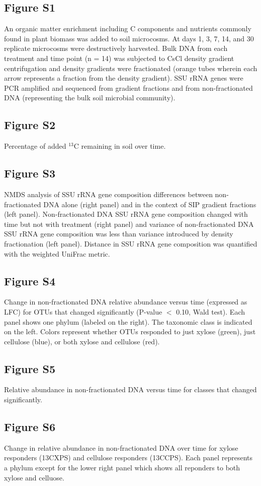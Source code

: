 \subsection{Figure S1}
An organic matter enrichment including C components and nutrients commonly found in plant biomass was added to soil microcosms. At days 1, 3, 7, 14, and 30 replicate microcosms were destructively harvested.  Bulk DNA from each treatment and time point (n = 14) was subjected to CsCl density gradient centrifugation and density gradients were fractionated (orange tubes wherein each arrow represents a fraction from the density gradient). SSU rRNA genes were PCR amplified and sequenced from gradient fractions and from non-fractionated DNA (representing the bulk soil microbial community).  \subsection{Figure S2}
Percentage of added $^{13}$C remaining in soil over time. \subsection{Figure S3}
NMDS analysis of SSU rRNA gene composition differences between  non-fractionated DNA alone (right panel) and in the context of SIP gradient fractions (left panel). Non-fractionated DNA SSU rRNA gene composition changed with time but not with treatment (right panel) and variance of non-fractionated DNA SSU rRNA gene composition was less than variance introduced by density fractionation (left panel). Distance in SSU rRNA gene composition was quantified with the weighted UniFrac metric.  \subsection{Figure S4}
Change in non-fractionated DNA relative abundance versus time (expressed as LFC) for OTUs that changed significantly (P-value $<$ 0.10, Wald test). Each panel shows one phylum (labeled on the right). The taxonomic class is indicated on the left. Colors represent whether OTUs responded to just xylose (green), just cellulose (blue), or both xylose and cellulose (red).  \subsection{Figure S5}
Relative abundance in non-fractionated DNA versus time for classes that changed significantly. \subsection{Figure S6}
Change in relative abundance in non-fractionated DNA over time for xylose
responders (13CXPS) and cellulose responders (13CCPS). Each panel represents
a phylum except for the lower right panel which shows all reponders to both
xylose and celluose.    
